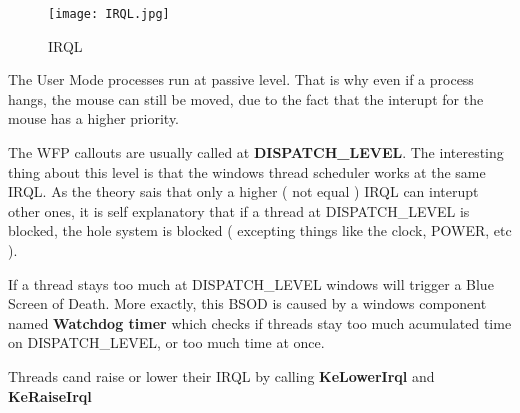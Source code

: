 \vspace{5mm}

\begin{figure}[h]
\centering
\texttt{[image: IRQL.jpg]}
\caption{IRQL}
\label{IRQL}
\end{figure}

\vspace{5mm}

The User Mode processes run at passive level. That is why even if a process hangs, the mouse can still be moved, due to the fact that the interupt for the mouse has a higher priority.

\vspace{5mm}

The WFP callouts are usually called at \textbf{DISPATCH\_LEVEL}. The interesting thing about this level is that the windows thread scheduler works at the same IRQL. As the theory sais
that only a higher ( not equal ) IRQL can interupt other ones, it is self explanatory that if a thread at DISPATCH\_LEVEL is blocked, the hole system is blocked ( excepting things like the clock,
POWER, etc ).

\vspace{5mm}

If a thread stays too much at DISPATCH\_LEVEL windows will trigger a Blue Screen of Death. More exactly, this BSOD is caused by a windows component named \textbf{Watchdog timer} which checks
if threads stay too much acumulated time on DISPATCH\_LEVEL, or too much time at once.

\vspace{5mm}

Threads cand raise or lower their IRQL by calling \textbf{KeLowerIrql} and \textbf{KeRaiseIrql}